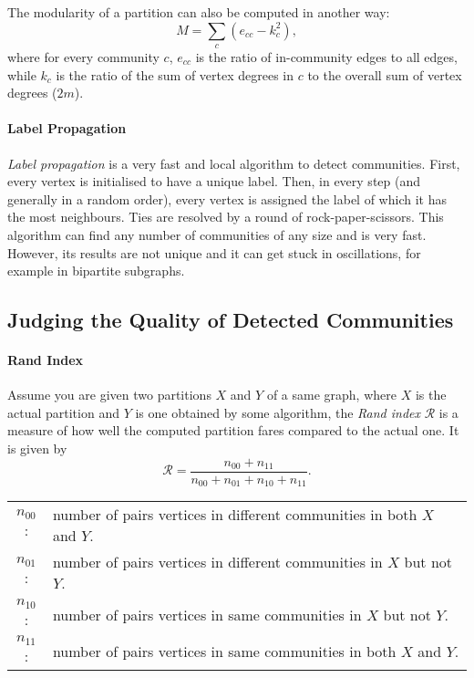 \documentclass[english]{panikzettel}
\begin{document}
The modularity of a partition can also be computed in another way: $$M = \sum_c \left(e_{cc} - k_c^2\right),$$ where for every community $c$, $e_{cc}$ is the ratio of in-community edges to all edges, while $k_c$ is the ratio of the sum of vertex degrees in $c$ to the overall sum of vertex degrees ($2m$).

\paragraph{Label Propagation}
\textit{Label propagation} is a very fast and local algorithm to detect communities.
First, every vertex is initialised to have a unique label.
Then, in every step (and generally in a random order), every vertex is assigned the label of which it has the most neighbours.
Ties are resolved by a round of rock-paper-scissors.
This algorithm can find any number of communities of any size and is very fast.
However, its results are not unique and it can get stuck in oscillations, for example in bipartite subgraphs.

\subsection{Judging the Quality of Detected Communities}

\paragraph{Rand Index}
Assume you are given two partitions $X$ and $Y$ of a same graph, where $X$ is the actual partition and $Y$ is one obtained by some algorithm, the \emph{Rand index} $\mathcal{R}$ is a measure of how well the computed partition fares compared to the actual one.
It is given by
\[
    \mathcal{R} = \frac{n_{00} + n_{11}}{n_{00} + n_{01} + n_{10} + n_{11}}.
\]

\begin{center}
    \begin{tabular}{cl}
        $n_{00}$: & number of pairs vertices in different communities in both $X$ and $Y$. \\
        $n_{01}$: & number of pairs vertices in different communities in $X$ but not $Y$. \\
        $n_{10}$: & number of pairs vertices in same communities in $X$ but not $Y$. \\
        $n_{11}$: & number of pairs vertices in same communities in both $X$ and $Y$. \\
    \end{tabular}
\end{center}
\end{document}

